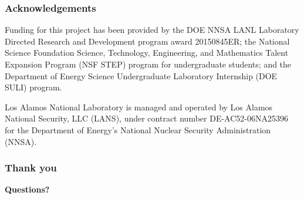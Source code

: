 \documentclass{beamer}
\begin{document}
\begin{frame}
  \frametitle{Acknowledgements}

  \footnotesize{Funding for this project has been provided by the DOE
    NNSA LANL Laboratory Directed Research and Development program
    award 20150845ER; the National Science Foundation Science,
    Technology, Engineering, and Mathematics Talent Expansion Program
    (NSF STEP) program for undergraduate students; and the Department
    of Energy Science Undergraduate Laboratory Internship (DOE SULI)
    program.}

  \vspace{0.2in}
  
  \footnotesize{Los Alamos National Laboratory is managed and operated
    by Los Alamos National Security, LLC (LANS), under contract number
    DE-AC52-06NA25396 for the Department of Energy’s National Nuclear
    Security Administration (NNSA).}
\end{frame}


\begin{frame}
  \frametitle{Thank you}
  \textbf{Questions?}
\end{frame}
\end{document}
